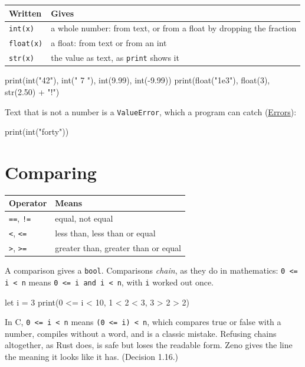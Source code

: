 \begin{center}
\begin{tabular}{lP{8cm}}
\toprule
Written & Gives \\
\midrule
\verb|int(x)| & a whole number: from text, or from a float by dropping the fraction \\
\verb|float(x)| & a float: from text or from an int \\
\verb|str(x)| & the value as text, as \verb|print| shows it \\
\bottomrule
\end{tabular}
\end{center}

\begin{zeno}
print(int("42"), int(" 7 "), int(9.99), int(-9.99))
print(float("1e3"), float(3), str(2.50) + "!")
\end{zeno}

Text that is not a number is a \verb|ValueError|, which a program can
catch (\hyperref[ch-errors]{Errors}):

\begin{zeno}[fails=yes]
print(int("forty"))
\end{zeno}

\section{Comparing}

\begin{center}
\begin{tabular}{ll}
\toprule
Operator & Means \\
\midrule
\verb|==|, \verb|!=| & equal, not equal \\
\verb|<|, \verb|<=| & less than, less than or equal \\
\verb|>|, \verb|>=| & greater than, greater than or equal \\
\bottomrule
\end{tabular}
\end{center}

A comparison gives a \verb|bool|. Comparisons \emph{chain}, as they do
in mathematics: \verb|0 <= i < n| means \verb|0 <= i and i < n|, with
\verb|i| worked out once.

\begin{zeno}
let i = 3
print(0 <= i < 10, 1 < 2 < 3, 3 > 2 > 2)
\end{zeno}

\begin{why}
In C, \verb|0 <= i < n| means \verb|(0 <= i) < n|, which compares true
or false with a number, compiles without a word, and is a classic
mistake. Refusing chains altogether, as Rust does, is safe but loses
the readable form. Zeno gives the line the meaning it looks like it
has. (Decision 1.16.)
\end{why}

